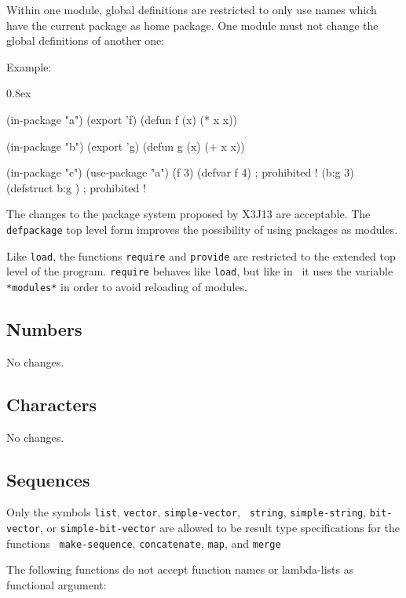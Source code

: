 Within one module, global definitions are restricted to only use names
which have the current package as home package. One module must not change
the global definitions of another one:

Example:
%
{\listing \parskip0.8ex

(in-package "a")
  (export 'f)
  (defun f (x) (* x x))

(in-package "b")
  (export 'g)
  (defun g (x) (+ x x))

(in-package "c")
  (use-package "a")
  (f 3)
  (defvar f 4)     ; prohibited !
  (b:g 3)
  (defstruct b:g ) ; prohibited !
}

The changes to the package system proposed by X3J13 are acceptable.
The {\tt defpackage} top level form improves the possibility of using
packages as modules.

Like {\tt load}, the functions {\tt require} and {\tt provide} are
restricted to the extended top level of the program. {\tt require}
behaves like {\tt load}, but like in \CL\ it uses the variable {\tt
*modules*} in order to avoid reloading of modules.

\subsection{Numbers}

No changes.

\subsection{Characters}

No changes.

\subsection{Sequences}
\label{sequences}

Only the symbols {\tt list}, {\tt vector}, {\tt simple-vector}, {\tt 
string}, {\tt simple-string}, {\tt bit-vector}, or {\tt simple-bit-vector} 
are allowed to be result type specifications for the functions {\tt 
make-sequence}, {\tt concatenate}, {\tt map}, and {\tt merge}

The following functions do not accept function names or lambda-lists as 
functional argument:

